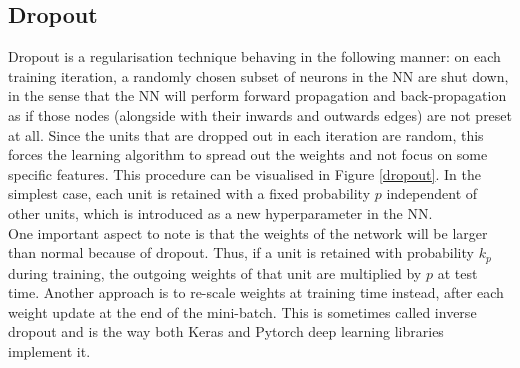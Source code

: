 \subsection{Dropout}

Dropout is a regularisation technique behaving in the following manner: on each training iteration, a randomly chosen subset of neurons in the NN are shut down, in the sense that the NN will perform forward propagation and back-propagation as if those nodes (alongside with their inwards and outwards edges) are not preset at all. Since the units that are dropped out in each iteration are random, this forces the learning algorithm to spread out the weights and not focus on some specific features. This procedure can be visualised in Figure \ref{dropout}. In the simplest case, each unit is retained with a fixed probability $p$ independent of other units, which is introduced as a new hyperparameter in the NN. \\

One important aspect to note is that the weights of the network will be larger than normal because of dropout. Thus, if a unit is retained with probability $k_p$ during training, the outgoing weights of that unit are multiplied by $p$ at test
time. Another approach is to re-scale weights at training time instead, after each weight update at the end of the mini-batch. This is sometimes called inverse dropout and is the way both Keras and Pytorch deep learning libraries implement it. \\



